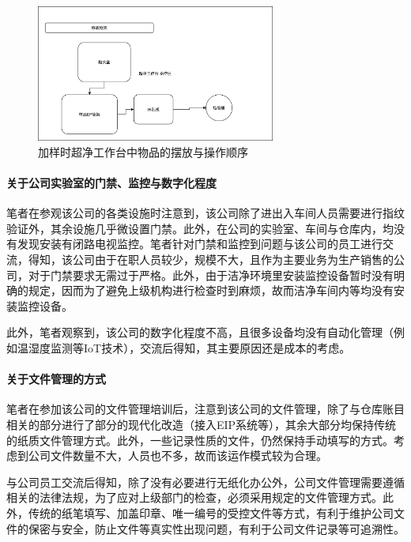 \documentclass[cn,black,12pt,normal]{elegantnote}
\begin{document}
\begin{figure}[H]
    \centering
    \includegraphics[width=0.7\textwidth]{image/AddMaterial.png}
    \caption{加样时超净工作台中物品的摆放与操作顺序}
    \label{AM}
\end{figure}

\paragraph{}

\paragraph{关于公司实验室的门禁、监控与数字化程度} 笔者在参观该公司的各类设施时注意到，该公司除了进出入车间人员需要进行指纹验证外，其余设施几乎微设置门禁。此外，在公司的实验室、车间与仓库内，均没有发现安装有闭路电视监控。笔者针对门禁和监控到问题与该公司的员工进行交流，得知，该公司由于在职人员较少，规模不大，且作为主要业务为生产销售的公司，对于门禁要求无需过于严格。此外，由于洁净环境里安装监控设备暂时没有明确的规定，因而为了避免上级机构进行检查时到麻烦，故而洁净车间内等均没有安装监控设备。

此外，笔者观察到，该公司的数字化程度不高，且很多设备均没有自动化管理（例如温湿度监测等IoT技术），交流后得知，其主要原因还是成本的考虑。

\paragraph{关于文件管理的方式} 笔者在参加该公司的文件管理培训后，注意到该公司的文件管理，除了与仓库账目相关的部分进行了部分的现代化改造（接入EIP系统等），其余大部分均保持传统的纸质文件管理方式。此外，一些记录性质的文件，仍然保持手动填写的方式。考虑到公司文件数量不大，人员也不多，故而该运作模式较为合理。

与公司员工交流后得知，除了没有必要进行无纸化办公外，公司文件管理需要遵循相关的法律法规，为了应对上级部门的检查，必须采用规定的文件管理方式。此外，传统的纸笔填写、加盖印章、唯一编号的受控文件等方式，有利于维护公司文件的保密与安全，防止文件等真实性出现问题，有利于公司文件记录等可追溯性。
\end{document}
